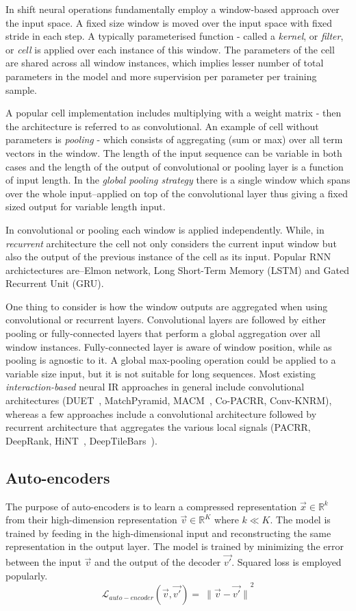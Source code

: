 In shift neural operations fundamentally employ a window-based approach over the input space. A fixed size window is moved over the input space with fixed stride in each step. A typically parameterised function - called a \textit{kernel}, or \textit{filter}, or \textit{cell} is applied over each instance of this window. The parameters of the cell are shared across all window instances, which implies lesser number of total parameters in the model and more supervision per parameter per training sample.

A popular cell implementation includes multiplying with a weight matrix - then the architecture is referred to as convolutional. An example of cell without parameters is \textit{pooling} - which consists of aggregating (sum or max) over all term vectors in the window. The length of the input sequence can be variable in both cases and the length of the output of convolutional or pooling layer is a function of input length. In the \textit{global pooling strategy} there is a single window which spans over the whole input--applied on top of the convolutional layer thus giving a fixed sized output for variable length input.

In convolutional or pooling each window is applied independently. While, in \textit{recurrent} architecture the cell not only considers the current input window but also the output of the previous instance of the cell as its input. Popular RNN archictectures are--Elmon network, Long Short-Term Memory (LSTM) and Gated Recurrent Unit (GRU).

One thing to consider is how the window outputs are aggregated when using convolutional or recurrent layers. Convolutional layers are followed by either pooling or fully-connected layers that perform a global aggregation over all window instances. Fully-connected layer is aware of window position, while as pooling is agnostic to it. A global max-pooling operation could be applied to a variable size input, but it is not suitable for long sequences. Most existing \textit{interaction-based} neural IR approaches in general include convolutional architectures (DUET~\citep{Mitra2017a}, MatchPyramid, MACM~\citep{Nie_sigir_2018}, Co-PACRR, Conv-KNRM), whereas a few approaches include a convolutional architecture followed by recurrent architecture that aggregates the various local signals (PACRR, DeepRank, HiNT~\citep{Fan_hint_2018}, DeepTileBars~\citep{deeptilebars_2019}).

\subsection{Auto-encoders}
The purpose of auto-encoders is to learn a compressed representation $\vec{x}\in\mathbb{R}^{k}$ from their high-dimension representation $\vec{v}\in\mathbb{R}^{K}$ where $k \ll K$. The model is trained by feeding in the high-dimensional input and reconstructing the same representation in the output layer. The model is trained by minimizing the error between the input $\vec{v}$ and the output of the decoder $\vec{v'}$. Squared loss is employed popularly.
\begin{equation}
	\mathcal{L}_{auto-encoder}(\vec{v},\vec{v'}) = \
    {\| \vec{v} - \vec{v'} \|}^2
\end{equation}

